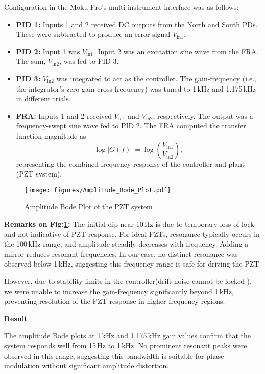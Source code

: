 \documentclass[colorlinks=true,pdfstartview=FitV,linkcolor=blue,
citecolor=red,urlcolor=magenta]{ligodoc}
\begin{document}
Configuration in the  Moku-Pro’s multi-instrument interface was as follows:
\begin{itemize}
    \item \textbf{PID 1:} Inputs 1 and 2 received DC outputs from the North and South PDs. These were subtracted to produce an error signal \( V_{\text{in1}} \).
    
    \item \textbf{PID 2:} Input 1 was \( V_{\text{in1}} \). Input 2 was an excitation sine wave from the FRA. The sum, \( V_{\text{in2}} \), was fed to PID 3.
    
    \item \textbf{PID 3:} \( V_{\text{in2}} \) was integrated to act as the controller. The gain-frequency (i.e., the integrator’s zero gain-cross frequency) was tuned to 1\,kHz and 1.175\,kHz in different trials.
    
    \item \textbf{FRA:} Inputs 1 and 2 received \( V_{\text{in1}} \) and \( V_{\text{in2}} \), respectively. The output was a frequency-swept sine wave fed to PID 2. The FRA computed the transfer function magnitude as
    \[
    \log |G(f)| = \log\left( \frac{V_{\text{in1}}}{V_{\text{in2}}} \right),
    \]
    representing the combined frequency response of the controller and plant (PZT system).
\end{itemize}
\begin{figure}[H]
    \centering
    \texttt{[image: figures/Amplitude\_Bode\_Plot.pdf]}
    \caption{Amplitude Bode Plot of the PZT system}
     \label{Am}
\end{figure}

\textbf{Remarks on Fig:\ref{Am}:} The initial dip near 10\,Hz is due to temporary loss of lock and not indicative of PZT response. For ideal PZTs, resonance typically occurs in the 100\,kHz range, and amplitude steadily decreases with frequency. Adding a mirror reduces resonant frequencies. In our case, no distinct resonance was observed below 1\,kHz, suggesting this frequency range is safe for driving the PZT.

However, due to stability limits in the controller(drift noise cannot be locked ), we were unable to increase the gain-frequency significantly beyond 1\,kHz, preventing resolution of the PZT response in higher-frequency regions.

\textbf{Result}  

The amplitude Bode plots at 1\,kHz and 1.175\,kHz gain values confirm that the system responds well from 15\,Hz to 1\,kHz. No prominent resonant peaks were observed in this range, suggesting this bandwidth is suitable for phase modulation without significant amplitude distortion.
\end{document}
